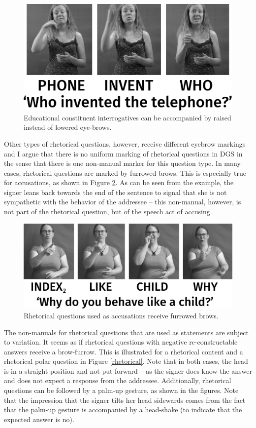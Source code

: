 \begin{figure}[bt]
\centering
	\includegraphics[width=1.0\textwidth]{educationalsw.jpg}
	\caption{Educational constituent interrogatives can be accompanied by raised instead of lowered eye-brows.}
	\label{educational}
\end{figure}

Other types of rhetorical questions, however, receive different eyebrow markings and I argue that there is no uniform marking of rhetorical questions in DGS in the sense that there is one non-manual marker for this question type. In many cases, rhetorical questions are marked by furrowed brows. This is especially true for accusations, as shown in Figure \ref{accusation}. As can be seen from the example, the signer leans back towards the end of the sentence to signal that she is not sympathetic with the behavior of the addressee -- this non-manual, however, is not part of the rhetorical question, but of the speech act of accusing.

\begin{figure}[bt]
\centering
	\includegraphics[width=1.0\textwidth]{accusationsw.jpg}
	\caption{Rhetorical questions used as accusations receive furrowed brows.}
	\label{accusation}
\end{figure}

The non-manuals for rhetorical questions that are used as statements are subject to variation. It seems as if rhetorical questions with negative re-constructable answers receive a brow-furrow. This is illustrated for a rhetorical content and a rhetorical polar question in Figure \ref{rhetorical}. Note that in both cases, the head is in a straight position and not put forward -- as the signer does know the answer and does not expect a response from the addressee. Additionally, rhetorical questions can be followed by a palm-up gesture, as shown in the figures. Note that the impression that the signer tilts her head sidewards comes from the fact that the palm-up gesture is accompanied by a head-shake (to indicate that the expected answer is no). 

